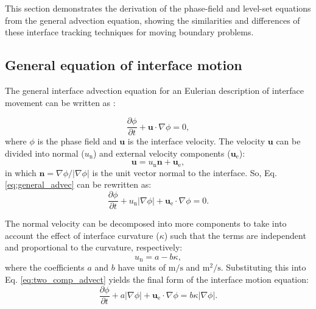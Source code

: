 This section demonstrates the derivation of the phase-field and level-set equations from the general advection equation, showing the similarities and differences of these interface tracking techniques for moving boundary problems.

\subsection{General equation of interface motion}

The general interface advection equation for an Eulerian description of interface movement can be written as \cite{Sun2007}:

\begin{equation} \label{eq:general_advec}
\frac{\partial \phi}{\partial t}+\boldsymbol{u} \cdot \nabla \phi=0,
\end{equation}
where $\phi$ is the phase field and $\boldsymbol{u}$ is the interface velocity. The velocity $\boldsymbol{u}$ can be divided into normal ($u_{\mathrm{n}}$) and external velocity components ($\boldsymbol{u}_{\mathrm{e}}$):
\begin{equation} \label{eq:two_comp_advect}
\boldsymbol{u}=u_{\mathrm{n}} \boldsymbol{n}+\boldsymbol{u}_{\mathrm{e}},
\end{equation}
in which $\boldsymbol{n}=\nabla \phi /|\nabla \phi|$ is the unit vector normal to the interface. So, Eq. \ref{eq:general_advec} can be rewritten as:
\begin{equation}
\frac{\partial \phi}{\partial t}+u_{\mathrm{n}}|\nabla \phi|+\boldsymbol{u}_{\mathrm{e}} \cdot \nabla \phi=0.
\end{equation}

The normal velocity can be decomposed into more components to take into account the effect of interface curvature ($\kappa$) such that the terms are independent and proportional to the curvature, respectively:
\begin{equation}
u_{\mathrm{n}} = a - b \kappa,
\end{equation}
where the coefficients $a$ and $b$ have units of $\mathrm{m}/\mathrm{s}$ and $\mathrm{m}^2/\mathrm{s}$. Substituting this into Eq. \ref{eq:two_comp_advect}  yields the final form of the interface motion equation:
\begin{equation} \label{eq:advect_kappa}
\frac{\partial \phi}{\partial t}+a|\nabla \phi|+\boldsymbol{u}_{\mathrm{e}} \cdot \nabla \phi=b \kappa|\nabla \phi|.
\end{equation}


